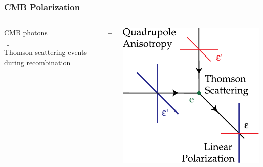 \documentclass[10pt,aspectratio=169]{beamer}
\begin{document}
\begin{frame}
\frametitle{CMB Polarization}

\begin{columns}
        \begin{column}{0.38\textwidth}
                \centering
                \large \alert{CMB photons\\
                $\downarrow$\\
                 Thomson scattering events
                during recombination}
        \end{column}

        \pause

        \begin{column}{0.10\textwidth}
                \centering
                \huge $\rightarrow$
        \end{column}

        \begin{column}{0.45\textwidth}
                \centering
                \includegraphics[width=\textwidth]{thomson_scattering}
        \end{column}
\end{columns}

\end{frame}
\end{document}
